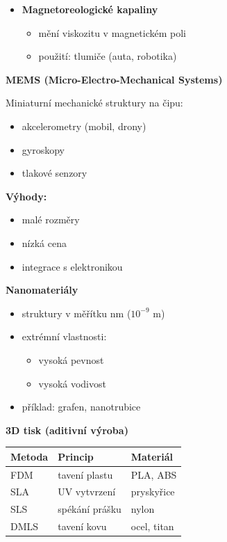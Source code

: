 \documentclass[a4paper,10pt]{article}
\begin{document}
\begin{vysvetlenibox}
\begin{itemize}
\item \textbf{Magnetoreologické kapaliny}
    \begin{itemize}
    \item mění viskozitu v magnetickém poli
    \item použití: tlumiče (auta, robotika)
    \end{itemize}
\end{itemize}

\textbf{MEMS (Micro-Electro-Mechanical Systems)}

Miniaturní mechanické struktury na čipu:

\begin{itemize}
\item akcelerometry (mobil, drony)
\item gyroskopy
\item tlakové senzory
\end{itemize}

\textbf{Výhody:}
\begin{itemize}
\item malé rozměry
\item nízká cena
\item integrace s elektronikou
\end{itemize}

\textbf{Nanomateriály}

\begin{itemize}
\item struktury v měřítku nm ($10^{-9}$ m)
\item extrémní vlastnosti:
\begin{itemize}
\item vysoká pevnost
\item vysoká vodivost
\end{itemize}
\item příklad: grafen, nanotrubice
\end{itemize}

\textbf{3D tisk (aditivní výroba)}

\begin{center}
\begin{tabularx}{0.95\linewidth}{l X l}
Metoda & Princip & Materiál \\
\hline
FDM  & tavení plastu & PLA, ABS \\
SLA  & UV vytvrzení & pryskyřice \\
SLS  & spékání prášku & nylon \\
DMLS & tavení kovu & ocel, titan \\
\end{tabularx}
\end{center}


\end{vysvetlenibox}
\end{document}
